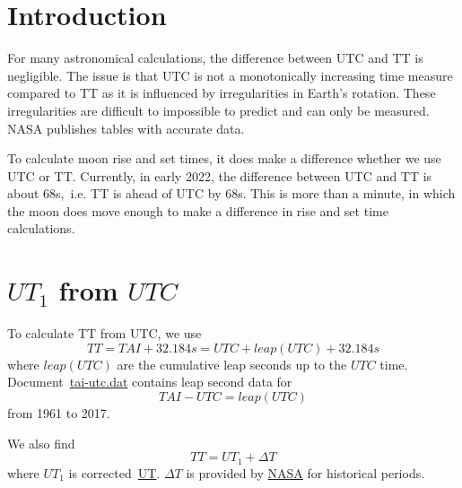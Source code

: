 \documentclass[]{article}
\title{}
\author{Sven Schmidt}
\begin{document}
\maketitle

\begin{abstract}

\end{abstract}

\section{Introduction}

For many astronomical calculations, the difference between UTC and TT is negligible.
The issue is that UTC is not a monotonically increasing time measure compared to TT
as it is influenced by irregularities in Earth's rotation. These irregularities are
difficult to impossible to predict and can only be measured. NASA publishes tables
with accurate data.

To calculate moon rise and set times, it does make a difference whether we use UTC or
TT. Currently, in early 2022, the difference between UTC and TT is about 68s,~i.e.
TT is ahead of UTC by 68s. This is more than a minute, in which the moon does move
enough to make a difference in rise and set time calculations.


\section{$UT_{1}$ from $UTC$}

To calculate TT from UTC, we use
\begin{equation}
\label{1}
TT = TAI + 32.184s = UTC + leap(UTC) + 32.184s
\end{equation}
where $leap(UTC)$ are the cumulative leap seconds up to the $UTC$ time.
Document~\href{https://cddis.nasa.gov/archive/products/iers/tai-utc.dat}{tai-utc.dat}
contains leap second data for
\begin{equation}
TAI - UTC = leap(UTC)
\end{equation}
from 1961 to 2017.

We also find
\begin{equation}
\label{2}
TT = UT_{1} + \Delta T
\end{equation}
where $UT_{1}$ is corrected~\href{https://stjarnhimlen.se/comp/time.html#deltat}{UT}.
$\Delta T$ is provided by \href{https://cddis.nasa.gov/archive/products/iers/historic_deltat.data}{NASA}
for historical periods.
\end{document}
